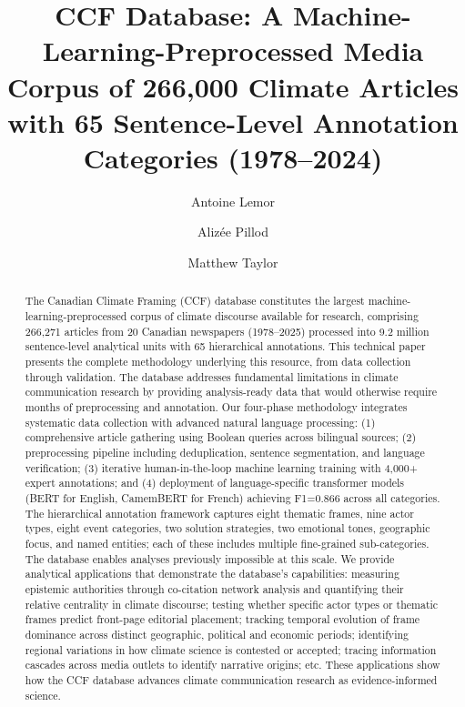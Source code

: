 \documentclass[12pt]{article}
\title{\textbf{CCF Database: A Machine-Learning-Preprocessed Media Corpus of 266,000 Climate Articles with 65 Sentence-Level Annotation Categories (1978–2024)}}
\author[1]{Antoine Lemor}
\author[2]{Alizée Pillod}
\author[2]{Matthew Taylor}
\affil[1]{Université de Sherbrooke}
\affil[2]{Université de Montréal}
\date{}
\begin{document}
\maketitle
\thispagestyle{empty}


\begin{abstract}
\noindent
The Canadian Climate Framing (CCF) database constitutes the largest machine-learning-preprocessed corpus of climate discourse available for research, comprising 266,271 articles from 20 Canadian newspapers (1978–2025) processed into 9.2 million sentence-level analytical units with 65 hierarchical annotations. This technical paper presents the complete methodology underlying this resource, from data collection through validation. The database addresses fundamental limitations in climate communication research by providing analysis-ready data that would otherwise require months of preprocessing and annotation. Our four-phase methodology integrates systematic data collection with advanced natural language processing: (1) comprehensive article gathering using Boolean queries across bilingual sources; (2) preprocessing pipeline including deduplication, sentence segmentation, and language verification; (3) iterative human-in-the-loop machine learning training with 4,000+ expert annotations; and (4) deployment of language-specific transformer models (BERT for English, CamemBERT for French) achieving F1=0.866 across all categories. The hierarchical annotation framework captures eight thematic frames, nine actor types, eight event categories, two solution strategies, two emotional tones, geographic focus, and named entities; each of these includes multiple fine-grained sub-categories. The database enables analyses previously impossible at this scale. We provide analytical applications that demonstrate the database's capabilities: measuring epistemic authorities through co-citation network analysis and quantifying their relative centrality in climate discourse; testing whether specific actor types or thematic frames predict front-page editorial placement; tracking temporal evolution of frame dominance across distinct geographic, political and economic periods; identifying regional variations in how climate science is contested or accepted; tracing information cascades across media outlets to identify narrative origins; etc. These applications show how the CCF database advances climate communication research as evidence-informed science.
\end{abstract}

\newpage
\tableofcontents
\newpage
\end{document}

